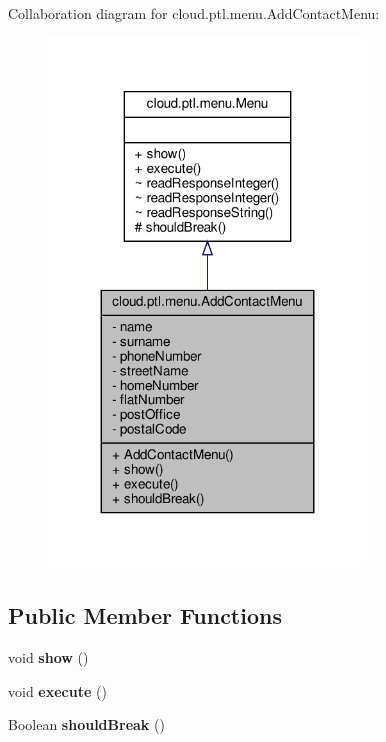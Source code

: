 Collaboration diagram for cloud.\+ptl.\+menu.\+Add\+Contact\+Menu\+:
\nopagebreak
\begin{figure}[H]
\begin{center}
\leavevmode
\includegraphics[width=239pt]{classcloud_1_1ptl_1_1menu_1_1AddContactMenu__coll__graph}
\end{center}
\end{figure}
\subsection*{Public Member Functions}
\begin{DoxyCompactItemize}
\item 
\mbox{\label{classcloud_1_1ptl_1_1menu_1_1AddContactMenu_a4a777d242c4272af84d36d59ebfd5780}} 
void {\bfseries show} ()
\item 
\mbox{\label{classcloud_1_1ptl_1_1menu_1_1AddContactMenu_a558adf8fececd6a2afe43b3415e46418}} 
void {\bfseries execute} ()
\item 
\mbox{\label{classcloud_1_1ptl_1_1menu_1_1AddContactMenu_ac712784ee8666bc60a6818492aff600c}} 
Boolean {\bfseries should\+Break} ()
\end{DoxyCompactItemize}
